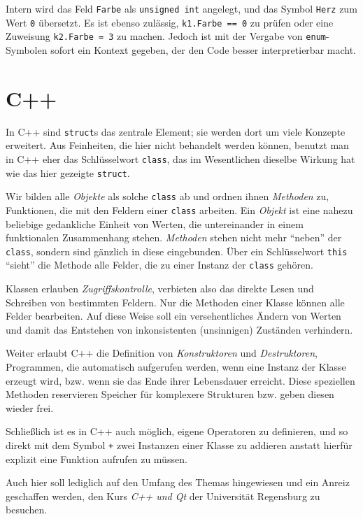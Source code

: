 Intern wird das Feld \texttt{Farbe} als \texttt{unsigned int} angelegt, und das Symbol \texttt{Herz} zum Wert \texttt{0} übersetzt. Es ist ebenso zulässig, \texttt{k1.Farbe == 0} zu prüfen oder eine Zuweisung \texttt{k2.Farbe = 3} zu machen. Jedoch ist mit der Vergabe von \texttt{enum}-Symbolen sofort ein Kontext gegeben, der den Code besser interpretierbar macht.

\section{C++}
\begin{plusbox}
In C++ sind \texttt{struct}s das zentrale Element; sie werden dort um viele Konzepte erweitert. Aus Feinheiten, die hier nicht behandelt werden können, benutzt man in C++ eher das Schlüsselwort \texttt{class}, das im Wesentlichen dieselbe Wirkung hat wie das hier gezeigte \texttt{struct}.

Wir bilden alle \emph{Objekte} als solche \texttt{class} ab und ordnen ihnen \emph{Methoden} zu, \ie Funktionen, die mit den Feldern einer \texttt{class} arbeiten. Ein \emph{Objekt} ist eine nahezu beliebige gedankliche Einheit von Werten, die untereinander in einem funktionalen Zusammenhang stehen. \emph{Methoden} stehen nicht mehr \enquote{neben} der \texttt{class}, sondern sind gänzlich in diese eingebunden. Über ein Schlüsselwort \texttt{this} \enquote{sieht} die Methode alle Felder, die zu einer Instanz der \texttt{class} gehören.

Klassen erlauben \emph{Zugriffskontrolle}, verbieten also das direkte Lesen und Schreiben von bestimmten Feldern. Nur die Methoden einer Klasse können alle Felder bearbeiten. Auf diese Weise soll ein versehentliches Ändern von Werten und damit das Entstehen von inkonsistenten (unsinnigen) Zuständen verhindern.

Weiter erlaubt C++ die Definition von \emph{Konstruktoren} und \emph{Destruktoren}, \ie Programmen, die automatisch aufgerufen werden, wenn eine Instanz der Klasse erzeugt wird, bzw. wenn sie das Ende ihrer Lebensdauer erreicht. Diese speziellen Methoden reservieren \idR Speicher für komplexere Strukturen bzw. geben diesen wieder frei.

Schließlich ist es in C++ auch möglich, eigene Operatoren zu definieren, und so direkt mit dem Symbol \texttt{+} zwei Instanzen einer Klasse zu addieren anstatt hierfür explizit eine Funktion aufrufen zu müssen.

Auch hier soll lediglich auf den Umfang des Themas hingewiesen und ein Anreiz geschaffen werden, den Kurs \emph{C++ und Qt} der Universität Regensburg zu besuchen.
\end{plusbox}
